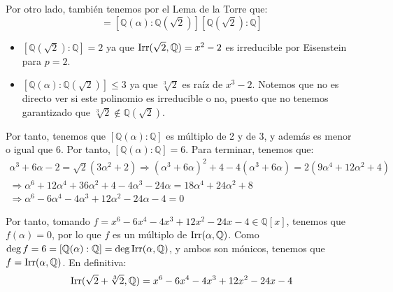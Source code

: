 \begin{ejercicio}
\begin{enumerate}[label=\alph*)]
            Por otro lado, también tenemos por el Lema de la Torre que:
            \begin{equation*}
                [\mathbb{Q}(\alpha):\mathbb{Q}] = [\mathbb{Q}(\alpha):\mathbb{Q}(\sqrt{2})][\mathbb{Q}(\sqrt{2}):\mathbb{Q}]
            \end{equation*}
            \begin{itemize}
                \item $[\mathbb{Q}(\sqrt{2}):\mathbb{Q}] = 2$ ya que $\operatorname{Irr}(\sqrt{2},\mathbb{Q}) = x^2-2$ es irreducible por Eisenstein para $p=2$.
                \item $[\mathbb{Q}(\alpha):\mathbb{Q}(\sqrt{2})] \leq 3$ ya que $\sqrt[3]{2}$ es raíz de $x^3-2$. Notemos que no es directo ver si este polinomio es irreducible o no, puesto que no tenemos garantizado que $\sqrt[3]{2}\notin \mathbb{Q}(\sqrt{2})$.
            \end{itemize}

            Por tanto, tenemos que $[\mathbb{Q}(\alpha):\mathbb{Q}]$ es múltiplo de 2 y de 3, y además es menor o igual que 6. Por tanto, $[\mathbb{Q}(\alpha):\mathbb{Q}] = 6$. Para terminar, tenemos que:
            \begin{multline*}
                \alpha^3+6\alpha-2 = \sqrt{2}(3\alpha^2+2) \Longrightarrow (\alpha^3+6\alpha)^2 +4 -4(\alpha^3+6\alpha) = 2(9\alpha^4 + 12\alpha^2 + 4)\\
                \Longrightarrow \alpha^6 + 12\alpha^4 + 36\alpha^2 + 4 - 4\alpha^3 - 24\alpha = 18\alpha^4 + 24\alpha^2 + 8 \\\Longrightarrow \alpha^6 - 6\alpha^4 -4\alpha^3 + 12\alpha^2 - 24\alpha - 4 = 0
            \end{multline*}

            Por tanto, tomando $f = x^6 - 6x^4 -4x^3 + 12x^2 - 24x - 4\in \mathbb{Q}[x]$, tenemos que $f(\alpha)=0$, por lo que $f$ es un múltiplo de $\operatorname{Irr}(\alpha,\mathbb{Q})$. Como $\deg f = 6 = [\mathbb{Q}(\alpha):\mathbb{Q}] = \deg \operatorname{Irr}(\alpha,\mathbb{Q})$, y ambos son mónicos, tenemos que $f = \operatorname{Irr}(\alpha,\mathbb{Q})$. En definitiva:
            \begin{equation*}
                \operatorname{Irr}(\sqrt{2}+\sqrt[3]{2},\mathbb{Q}) = x^6 - 6x^4 -4x^3 + 12x^2 - 24x - 4
            \end{equation*}
    \end{enumerate}
\end{ejercicio}

